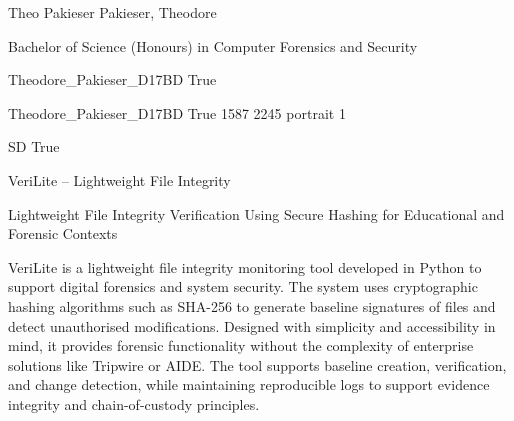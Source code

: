 \documentclass[twoside]{report}
\begin{document}
\begingroup{}\relax



\def\Key{Theodore_Pakieser_D17BD}

{Theo Pakieser}
{Pakieser, Theodore}

{Bachelor of Science (Honours) in Computer Forensics and Security}

{Theodore_Pakieser_D17BD}
{True}

{Theodore_Pakieser_D17BD}
{True}
{1587}
{2245}
{portrait}
{1}

{SD}
{True}

{VeriLite – Lightweight File Integrity}

{Lightweight File Integrity Verification Using Secure Hashing for Educational and Forensic Contexts}

{VeriLite is a lightweight file integrity monitoring tool developed in Python to support digital forensics and system security. The system uses cryptographic hashing algorithms such as SHA-256 to generate baseline signatures of files and detect unauthorised modifications. Designed with simplicity and accessibility in mind, it provides forensic functionality without the complexity of enterprise solutions like Tripwire or AIDE. The tool supports baseline creation, verification, and change detection, while maintaining reproducible logs to support evidence integrity and chain-of-custody principles.}
\end{document}
